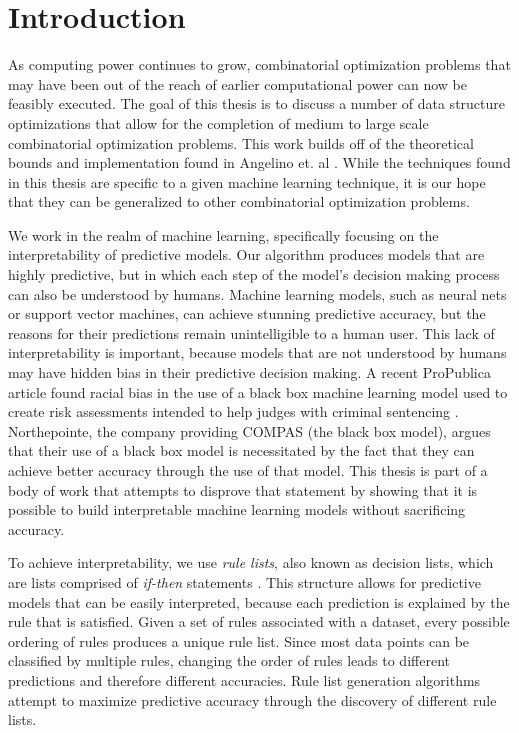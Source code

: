 \chapter{Introduction}
\label{introduction}

As computing power continues to grow, combinatorial optimization problems that may have been out of the reach of earlier computational power can now be feasibly executed.
The goal of this thesis is to discuss a number of data structure optimizations that allow for the completion of medium to large scale combinatorial optimization problems.
This work builds off of the theoretical bounds and implementation found in Angelino et. al \cite{AngelinoLaAlSeRu17}.
While the techniques found in this thesis are specific to a given machine learning technique, it is our hope that they can be generalized to other combinatorial optimization problems.

We work in the realm of machine learning, specifically focusing on the interpretability of predictive models.
Our algorithm produces models that are highly predictive, but in which each step of the model's decision making process can also be understood by humans.
Machine learning models, such as neural nets or support vector machines, can achieve stunning predictive accuracy, but the reasons for their predictions remain unintelligible to a human user.
This lack of interpretability is important, because models that are not understood by humans may have hidden bias in their predictive decision making.
A recent ProPublica article found racial bias in the use of a black box machine learning model used to create risk assessments intended to help judges with criminal sentencing \cite{LarsonMaKiAn16}.
Northepointe, the company providing COMPAS (the black box model), argues that their use of a black box model is necessitated by the fact that they can achieve better accuracy through the use of that model.
This thesis is part of a body of work that attempts to disprove that statement by showing that it is possible to build interpretable machine learning models without sacrificing accuracy.

To achieve interpretability, we use \emph{rule lists}, also known as decision lists, which are lists comprised of \emph{if-then} statements \cite{Rivest87}. 
This structure allows for predictive models that can be easily interpreted, because each prediction is explained by the rule that is satisfied. 
Given a set of rules associated with a dataset, every possible ordering of rules produces a unique rule list.
Since most data points can be classified by multiple rules, changing the order of rules leads to different predictions and therefore different accuracies. 
Rule list generation algorithms attempt to maximize predictive accuracy through the discovery of different rule lists.


